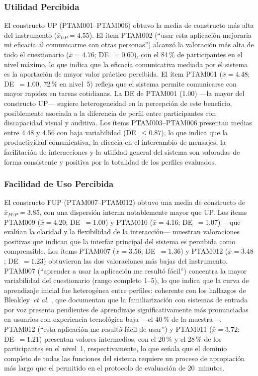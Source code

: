 \documentclass[journal]{IEEEtran}
\begin{document}
	\subsubsection{Utilidad Percibida}
	El constructo UP (PTAM001--PTAM006) obtuvo la media de constructo m\'as alta del instrumento ($\bar{x}_{UP}=4.55$). El \'item PTAM002 (``usar esta aplicaci\'on mejorar\'ia mi eficacia al comunicarme con otras personas'') alcanz\'o la valoraci\'on m\'as alta de todo el cuestionario ($\bar{x}=4.76$; DE~$=0.60$), con el 84\,\% de participantes en el nivel m\'aximo, lo que indica que la eficacia comunicativa mediada por el sistema es la aportaci\'on de mayor valor pr\'actico percibida. El \'item PTAM001 ($\bar{x}=4.48$; DE~$=1.00$, 72\,\% en nivel~5) refleja que el sistema permite comunicarse con mayor rapidez en tareas cotidianas. La DE de PTAM001 (1.00) ---la mayor del constructo UP--- sugiere heterogeneidad en la percepci\'on de este beneficio, posiblemente asociada a la diferencia de perfil entre participantes con discapacidad visual y auditiva. Los \'items PTAM003--PTAM006 presentan medias entre 4.48 y 4.56 con baja variabilidad (DE~$\leq 0.87$), lo que indica que la productividad comunicativa, la eficacia en el intercambio de mensajes, la facilitaci\'on de interacciones y la utilidad general del sistema son valoradas de forma consistente y positiva por la totalidad de los perfiles evaluados.
	
	\subsubsection{Facilidad de Uso Percibida}
	El constructo FUP (PTAM007--PTAM012) obtuvo una media de constructo de $\bar{x}_{FUP}=3.85$, con una dispersi\'on interna notablemente mayor que UP. Los \'items PTAM009 ($\bar{x}=4.20$; DE~$=1.00$) y PTAM010 ($\bar{x}=4.16$; DE~$=1.07$) ---que eval\'uan la claridad y la flexibilidad de la interacci\'on--- muestran valoraciones positivas que indican que la interfaz principal del sistema es percibida como comprensible. Los \'items PTAM007 ($\bar{x}=3.56$; DE~$=1.36$) y PTAM012 ($\bar{x}=3.48$; DE~$=1.23$) obtuvieron las dos valoraciones m\'as bajas del instrumento. PTAM007 (``aprender a usar la aplicaci\'on me result\'o f\'acil'') concentra la mayor variabilidad del cuestionario (rango completo 1--5), lo que indica que la curva de aprendizaje inicial fue heterog\'enea entre perfiles: coherente con los hallazgos de Bleakley~\textit{et al.} \cite{bleakley2022}, que documentan que la familiarizaci\'on con sistemas de entrada por voz presenta pendientes de aprendizaje significativamente m\'as pronunciadas en usuarios con experiencia tecnol\'ogica baja ---el 40\,\% de la muestra---. PTAM012 (``esta aplicaci\'on me result\'o f\'acil de usar'') y PTAM011 ($\bar{x}=3.72$; DE~$=1.21$) presentan valores intermedios, con el 20\,\% y el 28\,\% de los participantes en el nivel~1, respectivamente, lo que se\'nala que el dominio completo de todas las funciones del sistema requiere un proceso de apropiaci\'on m\'as largo que el permitido en el protocolo de evaluaci\'on de 20~minutos.
	
\end{document}
